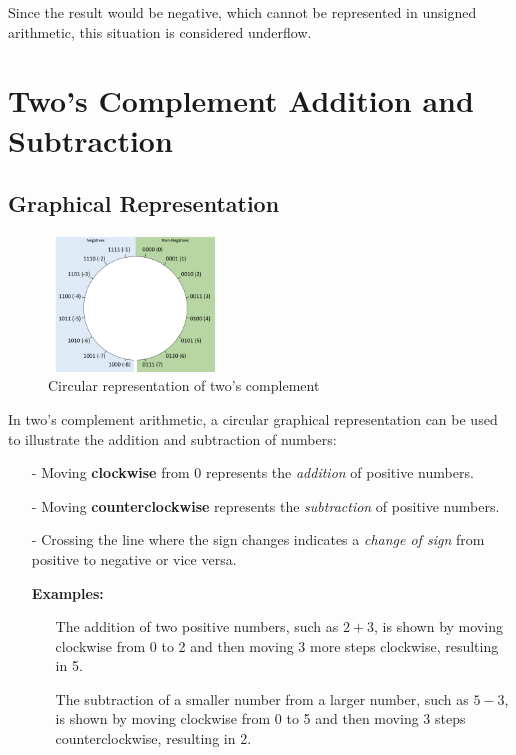 \documentclass[12pt,openany, tikz,border=10pt]{book}
\begin{document}
		Since the result would be negative, which cannot be represented in unsigned arithmetic, this situation is considered underflow.
		
		
		\section{Two’s Complement
		Addition and Subtraction}
		\subsection*{Graphical Representation}
		
		\begin{figure} %
			\centering
			\includegraphics[width=0.41\textwidth]{circle-twoscomplement.png} %
			\caption*{Circular representation of two's complement}
		\end{figure}
		
		In two's complement arithmetic, a circular graphical representation can be used to illustrate the addition and subtraction of numbers:
		\begin{itemize}
			\item[-] Moving \textbf{clockwise} from 0 represents the \textit{addition} of positive numbers.
			\item[-] Moving \textbf{counterclockwise} represents the \textit{subtraction} of positive numbers.
			\item[-] Crossing the line where the sign changes indicates a \textit{change of sign} from positive to negative or vice versa.
			\item[] \textbf{Examples:}
			      \begin{itemize}
			      	\item[] The addition of two positive numbers, such as \(2 + 3\), is shown by moving clockwise from 0 to 2 and then moving 3 more steps clockwise, resulting in 5.
			      	\item[] The subtraction of a smaller number from a larger number, such as \(5 - 3\), is shown by moving clockwise from 0 to 5 and then moving 3 steps counterclockwise, resulting in 2.  
			      \end{itemize}
		\end{itemize}
		
\end{document}
